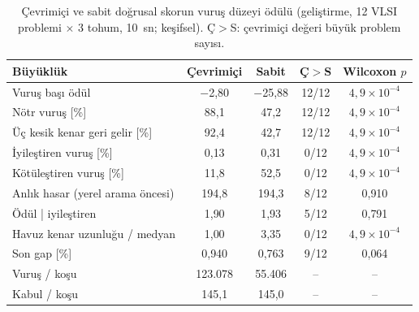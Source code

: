 \begin{table}[!htbp]
\centering\small\setlength{\tabcolsep}{3pt}
\caption{Çevrimiçi ve sabit doğrusal skorun vuruş düzeyi ödülü (geliştirme, 12 VLSI problemi $\times$ 3 tohum, 10~sn; keşifsel). Ç$>$S: çevrimiçi değeri büyük problem sayısı.}
\label{tab:v3-online-reward}
\begin{tabular*}{\textwidth}{@{\extracolsep{\fill}}lcccc}
\toprule
Büyüklük & Çevrimiçi & Sabit & Ç$>$S & Wilcoxon $p$ \\
\midrule
Vuruş başı ödül & $-$2{,}80 & $-$25{,}88 & 12/12 & $4{,}9\times10^{-4}$ \\
Nötr vuruş [\%] & 88{,}1 & 47{,}2 & 12/12 & $4{,}9\times10^{-4}$ \\
Üç kesik kenar geri gelir [\%] & 92{,}4 & 42{,}7 & 12/12 & $4{,}9\times10^{-4}$ \\
İyileştiren vuruş [\%] & 0{,}13 & 0{,}31 & 0/12 & $4{,}9\times10^{-4}$ \\
Kötüleştiren vuruş [\%] & 11{,}8 & 52{,}5 & 0/12 & $4{,}9\times10^{-4}$ \\
Anlık hasar (yerel arama öncesi) & 194{,}8 & 194{,}3 & 8/12 & 0{,}910 \\
Ödül | iyileştiren & 1{,}90 & 1{,}93 & 5/12 & 0{,}791 \\
Havuz kenar uzunluğu / medyan & 1{,}00 & 3{,}35 & 0/12 & $4{,}9\times10^{-4}$ \\
\midrule
Son gap [\%] & 0{,}940 & 0{,}763 & 9/12 & 0{,}064 \\
Vuruş / koşu & 123.078 & 55.406 & -- & -- \\
Kabul / koşu & 145{,}1 & 145{,}0 & -- & -- \\
\bottomrule
\end{tabular*}
\end{table}
